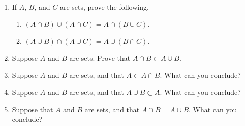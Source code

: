 \begin{enumerate}
    \item If $A$, $B$, and $C$ are sets, prove the following.
  \begin{enumerate}
      \item $(A \cap B) \cup (A \cap C) = A \cap (B \cup C)$.
      \item $(A \cup B) \cap (A \cup C) = A \cup (B \cap C)$.
  \end{enumerate}

    \item Suppose $A$ and $B$ are sets. Prove that $A \cap B \subset A \cup B$.

    \item Suppose $A$ and $B$ are sets, and that $A \subset A \cap B$. What can you conclude?

    \item Suppose $A$ and $B$ are sets, and that $A \cup B \subset A$. What can you conclude?

    \item Suppose that $A$ and $B$ are sets, and that $A \cap B = A \cup B$. What can you conclude?

\end{enumerate}
